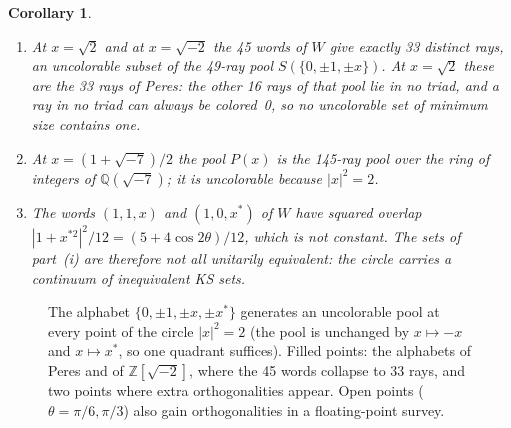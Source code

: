 \documentclass[11pt,a4paper]{article}
\newtheorem{corollary}[theorem]{Corollary}
\theoremstyle{remark}
\newcommand{\Z}{\mathbb{Z}}
\newcommand{\Q}{\mathbb{Q}}
\begin{document}
\begin{corollary}\label{cor:points}
\begin{enumerate}
\item[(a)] At $x=\sqrt2$ and at $x=\sqrt{-2}$ the 45 words of $W$ give exactly 33 distinct rays,
an uncolorable subset of the 49-ray pool $S(\{0,\pm1,\pm x\})$.  At $x=\sqrt2$ these are the 33
rays of Peres: the other 16 rays of that pool lie in no triad, and a ray in no triad can always be
colored~0, so no uncolorable set of minimum size contains one.
\item[(b)] At $x=(1+\sqrt{-7})/2$ the pool $P(x)$ is the 145-ray pool over the ring of integers of
$\Q(\sqrt{-7})$; it is uncolorable because $|x|^2=2$.
\item[(c)] The words $(1,1,x)$ and $(1,0,x^{*})$ of $W$ have squared overlap
$|1+x^{*2}|^2/12=(5+4\cos2\theta)/12$, which is not constant.  The sets of part~(i) are therefore
not all unitarily equivalent: the circle carries a continuum of inequivalent KS sets.
\end{enumerate}
\end{corollary}

\begin{figure}[t]
\centering
{}
\caption{The alphabet $\{0,\pm1,\pm x,\pm x^{*}\}$ generates an uncolorable pool at every point of
the circle $|x|^2=2$ (the pool is unchanged by $x\mapsto-x$ and $x\mapsto x^{*}$, so one quadrant
suffices).  Filled points: the alphabets of Peres and of $\Z[\sqrt{-2}]$, where the 45 words
collapse to 33 rays, and two points where extra orthogonalities appear.  Open points
($\theta=\pi/6,\pi/3$) also gain orthogonalities in a floating-point survey.}
\label{fig:circle}
\end{figure}
\end{document}
